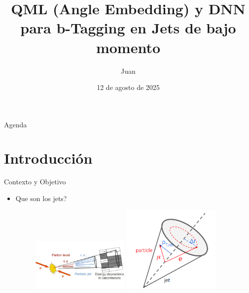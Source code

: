 \documentclass{beamer}
\title{QML (Angle Embedding) y DNN para b-Tagging en Jets de bajo momento}
\author{Juan}
\institute{Instituto de Física}
\date{12 de agosto de 2025}
\begin{document}
\begin{frame}
  \titlepage
\end{frame}

\begin{frame}{Agenda}
  \tableofcontents
\end{frame}

\section{Introducción}
\begin{frame}{Contexto y Objetivo}
  \begin{itemize}
    \item Que son los jets?
    \begin{figure}
      \centering
      \includegraphics[width=0.45\textwidth]{jet1.png}
      \hfill
      \includegraphics[width=0.45\textwidth]{jet2.png}
    \end{figure}
  \end{itemize}
\end{frame}
\end{document}
